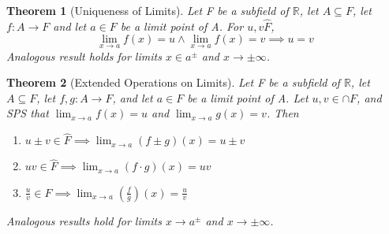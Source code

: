 \documentclass[11pt, oneside]{book}
\theoremstyle{break}
\newtheorem{thm}{Theorem}[section]
\newcommand{\bb}[1]{\mathbb{#1}}			%
\begin{document}
\begin{thm}[Uniqueness of Limits]
	Let F be a subfield of $\bb{R}$, let $A \subseteq F$, let $f: A \to F$ and let $a \in F$ be a limit point of A. For $u, v \hat{F}$,
		\[
			\lim_{x \to a} f(x) = u \land \lim_{x \to a} f(x) = v \implies u = v
		\]
	Analogous result holds for limits $x \in a^\pm$ and $x \to \pm \infty$.
\end{thm}

\begin{thm}[Extended Operations on Limits]
	Let F be a subfield of $\bb{R}$, let $A \subseteq F$, let $f, g: A \to F$, and let $a \in F$ be a limit point of A. Let $u ,v \in \cap{F}$, and SPS that $\lim_{x \to a} f(x) = u$ and $\lim_{x \to a} g(x) = v$. Then
	\begin{enumerate}
		\item $u \pm v \in \hat{F} \implies \lim_{x \to a} (f \pm g)(x) = u \pm v$
		\item $uv \in \hat{F} \implies \lim_{x \to a} (f \cdot g)(x) = uv$
		\item $\frac{u}{v} \in \hat{F} \implies \lim_{x \to a} (\frac{f}{g})(x) = \frac{u}{v}$
	\end{enumerate}
	Analogous results hold for limits $x \to a^\pm$ and $x \to \pm \infty$.
\end{thm}
\end{document}
